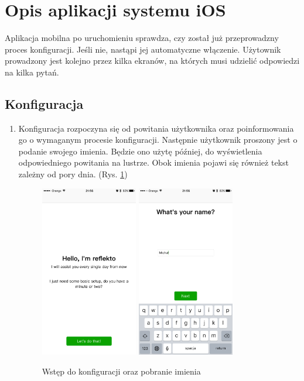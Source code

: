 \documentclass[a4paper,11pt]{article}
\begin{document}
\section{Opis aplikacji systemu iOS}

Aplikacja mobilna po uruchomieniu sprawdza, czy został już przeprowadzny proces konfiguracji. Jeśli nie, nastąpi jej automatyczne włączenie. Użytownik prowadzony jest kolejno przez kilka ekranów, na których musi udzielić odpowiedzi na kilka pytań.

\subsection{Konfiguracja}

\begin{enumerate}
	\item  Konfiguracja rozpoczyna się od powitania użytkownika oraz poinformowania go o wymaganym procesie konfiguracji. Następnie użytkownik proszony jest o podanie swojego imienia. Będzie ono użytę później, do wyświetlenia odpowiedniego powitania na lustrze. Obok imienia pojawi się również tekst zależny od pory dnia. (Rys. \ref{setup1})
	\begin{figure}[H]
		\centerline{
			\includegraphics[width=0.4\textwidth]{ios-screens/setup1.png}
			\includegraphics[width=0.4\textwidth]{ios-screens/setup2.png}
	}
		\caption {Wstęp do konfiguracji oraz pobranie imienia}
		\label{setup1}
	\end{figure}



\end{enumerate}
\end{document}
